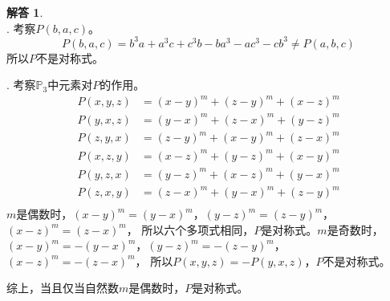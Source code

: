 \documentclass[12pt,UTF8]{ctexbook}
\newcommand{\dlim}[1]{^{\color{gray}\prime}#1}  %
\theoremstyle{definition}
\newtheorem*{so}{解答}
\theoremstyle{plain}
\begin{document}
\begin{so}
    \mbox{} \\
    . 考察$P(b, a, c)$。
    $$  P(b, a, c) = b^3a + a^3c + c^3b - ba^3 - ac^3 - cb^3 \neq P(a, b, c) $$
    所以$P$不是对称式。

    . 考察$\mathbb{P}_3$中元素对$P$的作用。
    \begin{align*}
        P(x, y, z) &= (x - y)^m + (z - y)^m + (x - z)^m \\
        P(y, x, z) &= (y - x)^m + (z - x)^m + (y - z)^m \\
        P(z, y, x) &= (z - y)^m + (x - y)^m + (z - x)^m \\
        P(x, z, y) &= (x - z)^m + (y - z)^m + (x - y)^m \\
        P(y, z, x) &= (y - z)^m + (x - z)^m + (y - x)^m \\
        P(z, x, y) &= (z - x)^m + (y - x)^m + (z - y)^m \\
    \end{align*}
    $m$是偶数时，$(x - y)^m = (y - x)^m$，$(y - z)^m = (z - y)^m$，$(x - z)^m = (z - x)^m$，
    所以六个多项式相同，$P$是对称式。$m$是奇数时，$(x - y)^m = -(y - x)^m$，$(y - z)^m = -(z - y)^m$，$(x - z)^m = -(z - x)^m$，
    所以$P(x, y, z) = -P(y, x, z) $，$P$不是对称式。

    综上，当且仅当自然数$m$是偶数时，$P$是对称式。
\end{so}




\end{document}
